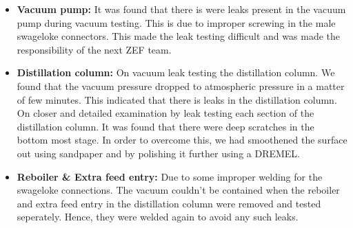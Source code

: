 \begin{itemize}
    \item \textbf{Vacuum pump:} It was found that there is were leaks present in the vacuum pump during vacuum testing. This is due to improper screwing in the male swageloke connectors. This made the leak testing difficult and was made the responsibility of the next ZEF team. 
    \item \textbf{Distillation column:} On vacuum leak testing the distillation column. We found that the vacuum pressure dropped to atmospheric pressure in a matter of few minutes. This indicated that there is leaks in the distillation column. On closer and detailed examination by leak testing each section of the distillation column. It was found that there were deep scratches in the bottom most stage. In order to overcome this, we had smoothened the surface out using sandpaper and by polishing it further using a DREMEL. 
    \item \textbf{Reboiler \& Extra feed entry:} Due to some improper welding for the swageloke connections. The vacuum couldn't be contained when the reboiler and extra feed entry in the distillation column were removed and tested seperately. Hence, they were welded again to avoid any such leaks. 
\end{itemize}


